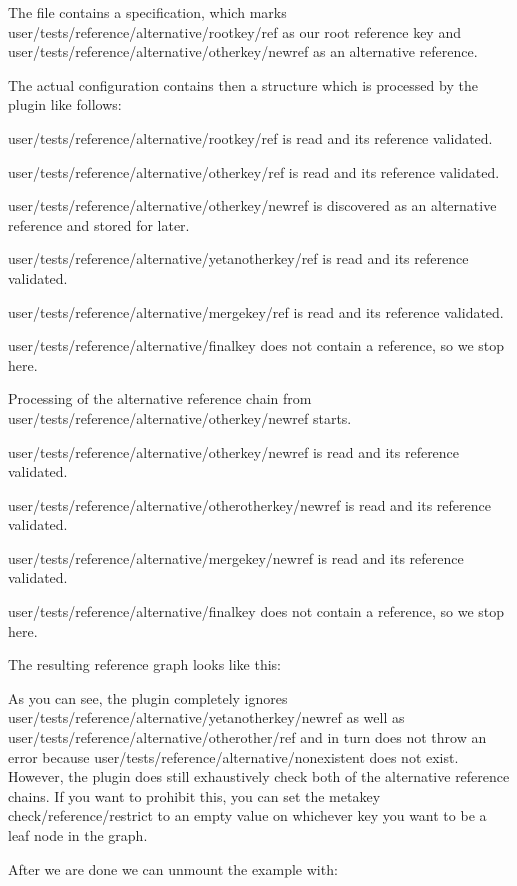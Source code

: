 The file contains a specification, which marks {\ttfamily user/tests/reference/alternative/rootkey/ref} as our root reference key and {\ttfamily user/tests/reference/alternative/otherkey/newref} as an alternative reference.

The actual configuration contains then a structure which is processed by the plugin like follows\+:


\begin{DoxyEnumerate}
\item {\ttfamily user/tests/reference/alternative/rootkey/ref} is read and its reference validated.
\item {\ttfamily user/tests/reference/alternative/otherkey/ref} is read and its reference validated.
\item {\ttfamily user/tests/reference/alternative/otherkey/newref} is discovered as an alternative reference and stored for later.
\item {\ttfamily user/tests/reference/alternative/yetanotherkey/ref} is read and its reference validated.
\item {\ttfamily user/tests/reference/alternative/mergekey/ref} is read and its reference validated.
\item {\ttfamily user/tests/reference/alternative/finalkey} does not contain a reference, so we stop here.
\item Processing of the alternative reference chain from {\ttfamily user/tests/reference/alternative/otherkey/newref} starts.
\item {\ttfamily user/tests/reference/alternative/otherkey/newref} is read and its reference validated.
\item {\ttfamily user/tests/reference/alternative/otherotherkey/newref} is read and its reference validated.
\item {\ttfamily user/tests/reference/alternative/mergekey/newref} is read and its reference validated.
\item {\ttfamily user/tests/reference/alternative/finalkey} does not contain a reference, so we stop here.
\end{DoxyEnumerate}

The resulting reference graph looks like this\+:



As you can see, the plugin completely ignores {\ttfamily user/tests/reference/alternative/yetanotherkey/newref} as well as {\ttfamily user/tests/reference/alternative/otherother/ref} and in turn does not throw an error because {\ttfamily user/tests/reference/alternative/nonexistent} does not exist. However, the plugin does still exhaustively check both of the alternative reference chains. If you want to prohibit this, you can set the metakey {\ttfamily check/reference/restrict} to an empty value on whichever key you want to be a leaf node in the graph.

After we are done we can unmount the example with\+:


\begin{DoxyCode}{0}
\end{DoxyCode}
 